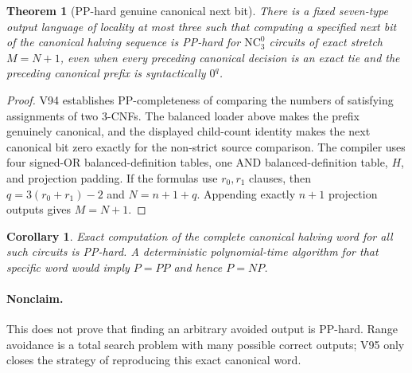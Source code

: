 \documentclass[11pt]{article}
\newtheorem{theorem}{Theorem}
\newtheorem{corollary}{Corollary}
\begin{document}
\begin{theorem}[PP-hard genuine canonical next bit]
There is a fixed seven-type output language of locality at most three such that
computing a specified next bit of the canonical halving sequence is PP-hard for
$\mathrm{NC}^0_3$ circuits of exact stretch $M=N+1$, even when every preceding
canonical decision is an exact tie and the preceding canonical prefix is
syntactically $0^q$.
\end{theorem}

\begin{proof}
V94 establishes PP-completeness of comparing the numbers of satisfying
assignments of two 3-CNFs.  The balanced loader above makes the prefix genuinely
canonical, and the displayed child-count identity makes the next canonical bit
zero exactly for the non-strict source comparison.  The compiler uses four
signed-OR balanced-definition tables, one AND balanced-definition table, $H$,
and projection padding.  If the formulas use $r_0,r_1$ clauses, then
$q=3(r_0+r_1)-2$ and $N=n+1+q$.  Appending exactly $n+1$ projection outputs
gives $M=N+1$.
\end{proof}

\begin{corollary}
Exact computation of the complete canonical halving word for all such circuits
is PP-hard.  A deterministic polynomial-time algorithm for that specific word
would imply $P=PP$ and hence $P=NP$.
\end{corollary}

\paragraph{Nonclaim.}
This does not prove that finding an arbitrary avoided output is PP-hard.  Range
avoidance is a total search problem with many possible correct outputs; V95 only
closes the strategy of reproducing this exact canonical word.
\end{document}
